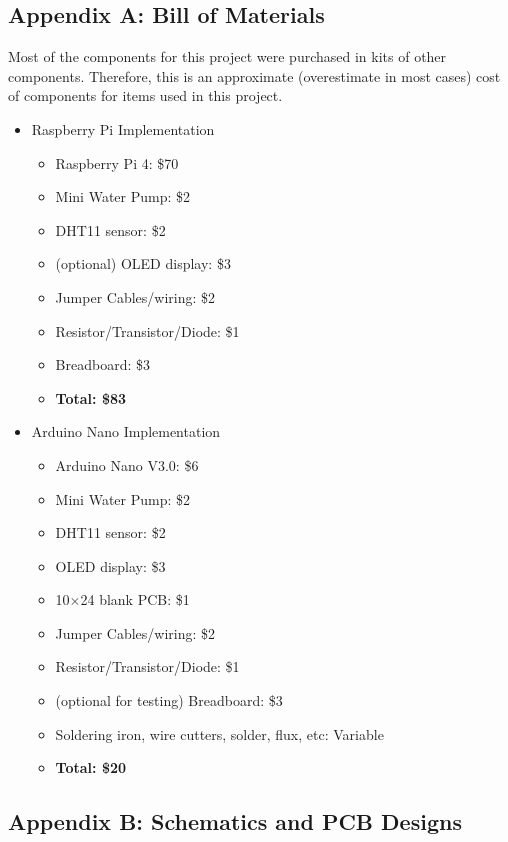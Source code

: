 \documentclass{article}
\begin{document}
	\subsection{Appendix A: Bill of Materials}
	Most of the components for this project were purchased in kits of other components. Therefore, this is an approximate (overestimate in most cases) cost of components for items used in this project. 
	
	\begin{multicols}{2}
		\begin{itemize}
			\item Raspberry Pi Implementation
			\begin{itemize}
				\item Raspberry Pi 4: \$70
				\item Mini Water Pump: \$2
				\item DHT11 sensor: \$2
				\item (optional) OLED display: \$3
				\item Jumper Cables/wiring: \$2
				\item Resistor/Transistor/Diode: \$1
				\item Breadboard: \$3
				\item \textbf{Total: \$83}
			\end{itemize}
			
			\columnbreak
			
			\item Arduino Nano Implementation
			\begin{itemize}
				\item Arduino Nano V3.0: \$6
				\item Mini Water Pump: \$2
				\item DHT11 sensor: \$2
				\item OLED display: \$3
				\item 10$\times$24 blank PCB: \$1
				\item Jumper Cables/wiring: \$2
				\item Resistor/Transistor/Diode: \$1
				\item (optional for testing) Breadboard: \$3
				\item Soldering iron, wire cutters, solder, flux, etc: Variable
				\item \textbf{Total: \$20}
			\end{itemize}
		\end{itemize}
	\end{multicols}
	
	\subsection{Appendix B: Schematics and PCB Designs \label{appendix:schematics}}
	
\end{document}
